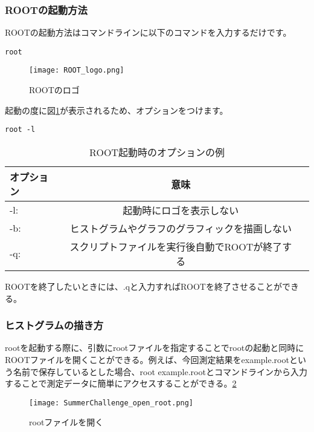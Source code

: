 \documentclass[10pt,a4j]{jarticle}
\begin{document}
\subsubsection{ROOTの起動方法}
ROOTの起動方法はコマンドラインに以下のコマンドを入力するだけです。
\begin{lstlisting}
root
\end{lstlisting}
\begin{figure}[ht]
\begin{center}
\texttt{[image: ROOT\_logo.png]}
\caption{ROOTのロゴ}
\label{fig:ROOT_logo}
\end{center}
\end{figure}
起動の度に図\ref{fig:ROOT_logo}が表示されるため、オプションをつけます。
\begin{lstlisting}
root -l
\end{lstlisting}
\begin{table}[ht]
  \caption{ROOT起動時のオプションの例}
  \centering
  \begin{tabular}{lcr}
    \hline
    オプション  & 意味 \\
    \hline \hline
      -l:  & 起動時にロゴを表示しない  \\
      -b:  & ヒストグラムやグラフのグラフィックを描画しない \\
      -q:  & スクリプトファイルを実行後自動でROOTが終了する \\
    \hline
  \end{tabular}
\end{table}
ROOTを終了したいときには、.qと入力すればROOTを終了させることができる。

\subsubsection{ヒストグラムの描き方}
rootを起動する際に、引数にrootファイルを指定することでrootの起動と同時にROOTファイルを開くことができる。例えば、今回測定結果をexample.rootという名前で保存しているとした場合、root example.rootとコマンドラインから入力することで測定データに簡単にアクセスすることができる。\ref{fig:open_ROOT}
\begin{figure}[h]
\begin{center}
\texttt{[image: SummerChallenge\_open\_root.png]}
\caption{rootファイルを開く}
\label{fig:open_ROOT}
\end{center}
\end{figure}
\end{document}
